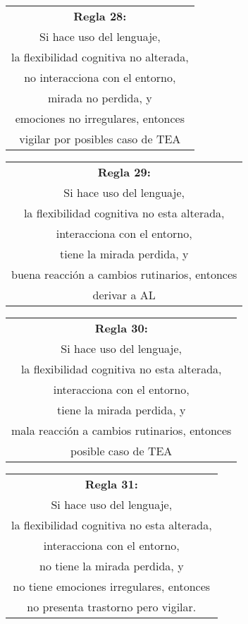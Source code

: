 \documentclass[letterpaper,12pt]{article}
\begin{document}
\begin{center}
	\begin{tabular}{|c|}
		\hline 
		\textbf{Regla 28:} \\
		Si hace uso del lenguaje,\\
		la flexibilidad cognitiva no alterada,\\
		no interacciona con el entorno,\\
		mirada no perdida, y\\
		emociones no irregulares, entonces\\
		vigilar por posibles caso de TEA\\
\hline 
\end{tabular} 
\end{center}

\begin{center}
	\begin{tabular}{|c|}
		\hline 
		\textbf{Regla 29:} \\
		Si hace uso del lenguaje,\\
		la flexibilidad cognitiva no esta alterada,\\
		interacciona con el entorno,\\
		tiene la mirada perdida, y\\
		buena reacción a cambios rutinarios, entonces\\
		derivar a AL\\
\hline 
\end{tabular} 
\end{center}	
		
\begin{center}
	\begin{tabular}{|c|}
		\hline 
		\textbf{Regla 30:} \\
		Si hace uso del lenguaje,\\
		la flexibilidad cognitiva no esta alterada,\\
		interacciona con el entorno,\\
		tiene la mirada perdida, y\\
		mala reacción a cambios rutinarios, entonces\\
		posible caso de TEA\\
\hline 
\end{tabular} 
\end{center}
		
\begin{center}
	\begin{tabular}{|c|}
		\hline 
		\textbf{Regla 31:} \\
		Si hace uso del lenguaje,\\
		la flexibilidad cognitiva no esta alterada,\\
		interacciona con el entorno,\\
		no tiene la mirada perdida, y\\
		no tiene emociones irregulares, entonces\\
		no presenta trastorno pero vigilar.\\
\hline 
\end{tabular} 
\end{center}
		
\end{document}
